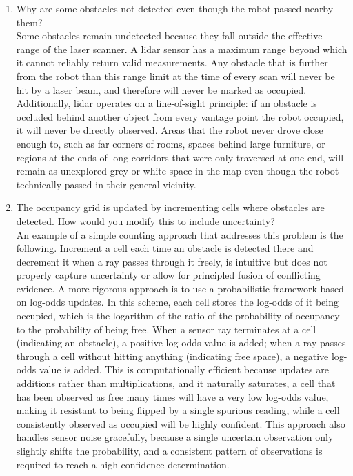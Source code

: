 \documentclass[11 pt , a 4 paper ]{article}
\theoremstyle{definition}
\begin{document}
\begin{enumerate}
    \item Why are some obstacles not detected even though the robot passed nearby them?\\
      \newline \noindent Some obstacles remain undetected because they fall outside the effective range of the laser scanner. A lidar sensor has a maximum range beyond which it cannot reliably return valid measurements. Any obstacle that is further from the robot than this range limit at the time of every scan will never be hit by a laser beam, and therefore will never be marked as occupied. Additionally, lidar operates on a line-of-sight principle: if an obstacle is occluded behind another object from every vantage point the robot occupied, it will never be directly observed. Areas that the robot never drove close enough to, such as far corners of rooms, spaces behind large furniture, or regions at the ends of long corridors that were only traversed at one end, will remain as unexplored grey or white space in the map even though the robot technically passed in their general vicinity.
    \item The occupancy grid is updated by incrementing cells where obstacles are detected. How would you modify this to include uncertainty?\\
      \newline \noindent An example of a simple counting approach that addresses this problem is the following. Increment a cell each time an obstacle is detected there and decrement it when a ray passes through it freely, is intuitive but does not properly capture uncertainty or allow for principled fusion of conflicting evidence. A more rigorous approach is to use a probabilistic framework based on log-odds updates. In this scheme, each cell stores the log-odds of it being occupied, which is the logarithm of the ratio of the probability of occupancy to the probability of being free. When a sensor ray terminates at a cell (indicating an obstacle), a positive log-odds value is added; when a ray passes through a cell without hitting anything (indicating free space), a negative log-odds value is added. This is computationally efficient because updates are additions rather than multiplications, and it naturally saturates, a cell that has been observed as free many times will have a very low log-odds value, making it resistant to being flipped by a single spurious reading, while a cell consistently observed as occupied will be highly confident. This approach also handles sensor noise gracefully, because a single uncertain observation only slightly shifts the probability, and a consistent pattern of observations is required to reach a high-confidence determination.

\end{enumerate}
\end{document}
